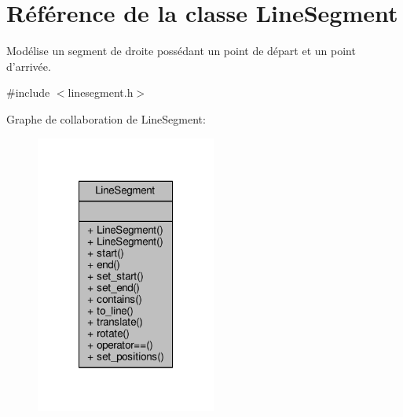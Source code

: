 \hypertarget{classLineSegment}{\section{Référence de la classe Line\+Segment}
\label{classLineSegment}
}


Modélise un segment de droite possédant un point de départ et un point d'arrivée.  




{\ttfamily \#include $<$linesegment.\+h$>$}



Graphe de collaboration de Line\+Segment\+:\nopagebreak
\begin{figure}[H]
\begin{center}
\leavevmode
\includegraphics[width=168pt]{df/dd8/classLineSegment__coll__graph}
\end{center}
\end{figure}
